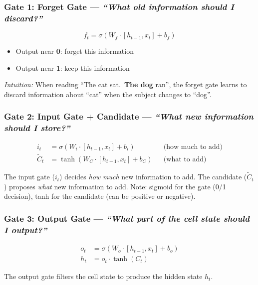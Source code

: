 \documentclass[11pt,a4paper]{article}
\begin{document}
\subsubsection*{Gate 1: Forget Gate --- \textit{``What old information should I discard?''}}

\begin{equation}
f_t = \sigma(W_f \cdot [h_{t-1}, x_t] + b_f)
\end{equation}

\begin{itemize}[leftmargin=1.5em]
    \item Output near \textbf{0}: forget this information
    \item Output near \textbf{1}: keep this information
\end{itemize}

\textit{Intuition:} When reading ``The cat sat.\ \textbf{The dog} ran'', the forget gate learns to discard information about ``cat'' when the subject changes to ``dog''.

\subsubsection*{Gate 2: Input Gate + Candidate --- \textit{``What new information should I store?''}}

\begin{align}
i_t &= \sigma(W_i \cdot [h_{t-1}, x_t] + b_i) && \text{(how much to add)} \\
\tilde{C}_t &= \tanh(W_C \cdot [h_{t-1}, x_t] + b_C) && \text{(what to add)}
\end{align}

The input gate ($i_t$) decides \textit{how much} new information to add. The candidate ($\tilde{C}_t$) proposes \textit{what} new information to add. Note: sigmoid for the gate (0/1 decision), tanh for the candidate (can be positive or negative).

\subsubsection*{Gate 3: Output Gate --- \textit{``What part of the cell state should I output?''}}

\begin{align}
o_t &= \sigma(W_o \cdot [h_{t-1}, x_t] + b_o) \\
h_t &= o_t \cdot \tanh(C_t)
\end{align}

The output gate filters the cell state to produce the hidden state $h_t$.
\end{document}
